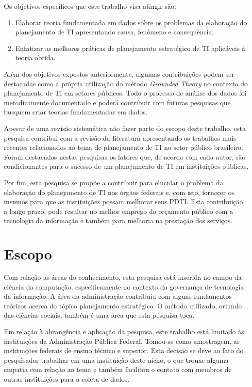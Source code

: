 Os objetivos específicos que este trabalho visa atingir são:
\begin{enumerate}
\item Elaborar teoria fundamentada em dados sobre os problemas da elaboração do planejamento de TI apresentando causa, fenômeno e consequência;
\item Enfatizar as melhores práticas de planejamento estratégico de TI aplicáveis à teoria obtida.
\end{enumerate}

Além dos objetivos expostos anteriormente, algumas contribuições podem ser destacadas como a própria utilização do método \textit{Grounded Theory} no contexto do planejamento de TI em setores públicos. Todo o processo de análise dos dados foi metodicamente documentado e poderá contribuir com futuras pesquisas que busquem criar teorias fundamentadas em dados.

Apesar de uma revisão sistemática não fazer parte do escopo deste trabalho, esta pesquisa contribui com a revisão da literatura apresentando os trabalhos mais recentes relacionados ao tema de planejamento de TI no setor público brasileiro. Foram destacados nestas pesquisas os fatores que, de acordo com cada autor, são condicionantes para o sucesso de um planejamento de TI em instituições públicas.

Por fim, esta pesquisa se propõe a contribuir para elucidar o problema da elaboração do planejamento de TI nos órgãos federais e, com isto, fornecer os insumos para que as instituições possam melhorar seus PDTI. Esta contribuição, a longo prazo, pode resultar no melhor emprego do orçamento público com a tecnologia da informação e também para melhoria na prestação dos serviços.


\section{Escopo}
Com relação as áreas do conhecimento, esta pesquisa está inserida no campo da ciência da computação, especificamente no contexto da governança de tecnologia da informação. A área da administração contribuiu com alguns fundamentos teóricos acerca do tópico planejamento estratégico. O método utilizado, oriundo das ciências sociais, também é uma área que esta pesquisa toca.

Em relação à abrangência e aplicação da pesquisa, este trabalho está limitado às instituições da Administração Pública Federal. Tomou-se como amostragem, as instituições federais de ensino técnico e superior. Esta decisão se deve ao fato do pesquisador trabalhar em uma instituição deste nicho, o que trouxe alguma empatia com relação ao tema e também facilitou o contato com membros de outras instituições para a coleta de dados.

